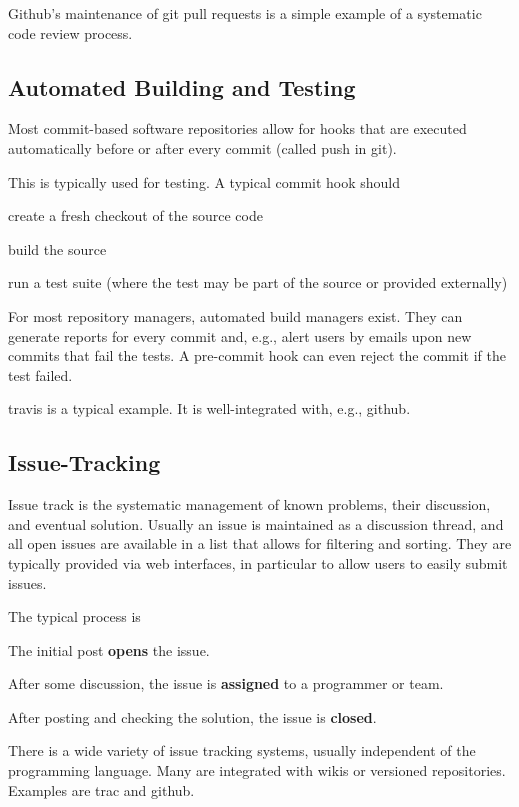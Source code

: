 Github's maintenance of git pull requests is a simple example of a systematic code review process.

\subsection{Automated Building and Testing}

Most commit-based software repositories allow for hooks that are executed automatically before or after every commit (called push in git).

This is typically used for testing.
A typical commit hook should
\begin{compactitem}
 \item create a fresh checkout of the source code
 \item build the source
 \item run a test suite (where the test may be part of the source or provided externally)
\end{compactitem}

For most repository managers, automated build managers exist.
They can generate reports for every commit and, e.g., alert users by emails upon new commits that fail the tests.
A pre-commit hook can even reject the commit if the test failed.

travis is a typical example.
It is well-integrated with, e.g., github.

\subsection{Issue-Tracking}

Issue track is the systematic management of known problems, their discussion, and eventual solution.
Usually an issue is maintained as a discussion thread, and all open issues are available in a list that allows for filtering and sorting.
They are typically provided via web interfaces, in particular to allow users to easily submit issues.

The typical process is
\begin{compactenum}
 \item The initial post \textbf{opens} the issue.
 \item After some discussion, the issue is \textbf{assigned} to a programmer or team.
 \item After posting and checking the solution, the issue is \textbf{closed}.
\end{compactenum}

There is a wide variety of issue tracking systems, usually independent of the programming language.
Many are integrated with wikis or versioned repositories.
Examples are trac and github.

